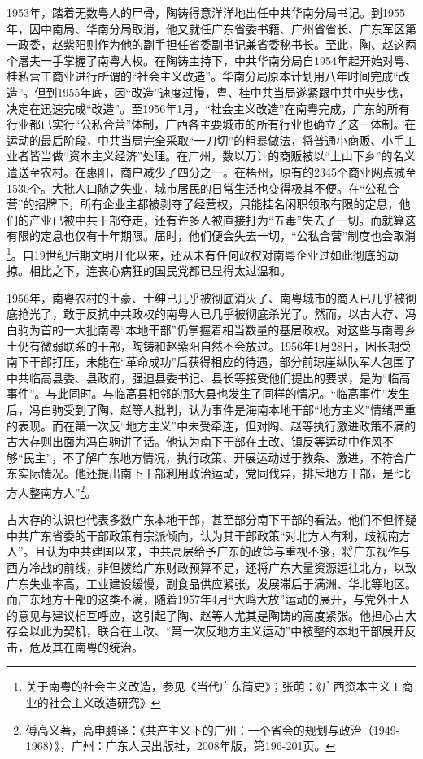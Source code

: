 1953年，踏着无数粤人的尸骨，陶铸得意洋洋地出任中共华南分局书记。到1955年，因中南局、华南分局取消，他又就任广东省委书籍、广州省省长、广东军区第一政委，赵紫阳则作为他的副手担任省委副书记兼省委秘书长。至此，陶、赵这两个屠夫一手掌握了南粤大权。在陶铸主持下，中共华南分局自1954年起开始对粤、桂私营工商业进行所谓的“社会主义改造”。华南分局原本计划用八年时间完成“改造”。但到1955年底，因“改造”速度过慢，粤、桂中共当局遂紧跟中共中央步伐，决定在迅速完成“改造”。至1956年1月，“社会主义改造”在南粤完成，广东的所有行业都已实行“公私合营”体制，广西各主要城市的所有行业也确立了这一体制。在运动的最后阶段，中共当局完全采取“一刀切”的粗暴做法，将普通小商贩、小手工业者皆当做“资本主义经济”处理。在广州，数以万计的商贩被以“上山下乡”的名义遣送至农村。在惠阳，商户减少了四分之一。在梧州，原有的2345个商业网点减至1530个。大批人口随之失业，城市居民的日常生活也变得极其不便。在“公私合营”的招牌下，所有企业主都被剥夺了经营权，只能挂名闲职领取有限的定息，他们的产业已被中共干部夺走，还有许多人被直接打为“五毒”失去了一切。而就算这有限的定息也仅有十年期限。届时，他们便会失去一切，“公私合营”制度也会取消\footnote{关于南粤的社会主义改造，参见《当代广东简史》；张萌：《广西资本主义工商业的社会主义改造研究》}。自19世纪后期文明开化以来，还从未有任何政权对南粤企业过如此彻底的劫掠。相比之下，连丧心病狂的国民党都已显得太过温和。

1956年，南粤农村的土豪、士绅已几乎被彻底消灭了、南粤城市的商人已几乎被彻底抢光了，敢于反抗中共政权的南粤人已几乎被彻底杀光了。然而，以古大存、冯白驹为首的一大批南粤“本地干部”仍掌握着相当数量的基层政权。对这些与南粤乡土仍有微弱联系的干部，陶铸和赵紫阳自然不会放过。1956年1月28日，因长期受南下干部打压，未能在“革命成功”后获得相应的待遇，部分前琼崖纵队军人包围了中共临高县委、县政府，强迫县委书记、县长等接受他们提出的要求，是为“临高事件”。与此同时。与临高县相邻的那大县也发生了同样的情况。“临高事件”发生后，冯白驹受到了陶、赵等人批判，认为事件是海南本地干部“地方主义”情绪严重的表现。而在第一次反“地方主义”中未受牵连，但对陶、赵等执行激进政策不满的古大存则出面为冯白驹讲了话。他认为南下干部在土改、镇反等运动中作风不够“民主”，不了解广东地方情况，执行政策、开展运动过于教条、激进，不符合广东实际情况。他还提出南下干部利用政治运动，党同伐异，排斥地方干部，是“北方人整南方人”\footnote{傅高义著，高申鹏译：《共产主义下的广州：一个省会的规划与政治（1949-1968）》，广州：广东人民出版社，2008年版，第196-201页。}。

古大存的认识也代表多数广东本地干部，甚至部分南下干部的看法。他们不但怀疑中共广东省委的干部政策有宗派倾向，认为其干部政策“对北方人有利，歧视南方人”。且认为中共建国以来，中共高层给予广东的政策与重视不够，将广东视作与西方冷战的前线，非但拨给广东财政预算不足，还将广东大量资源运往北方，以致广东失业率高，工业建设缓慢，副食品供应紧张，发展滞后于满洲、华北等地区。而广东地方干部的这类不满，随着1957年4月“大鸣大放”运动的展开，与党外士人的意见与建议相互呼应，这引起了陶、赵等人尤其是陶铸的高度紧张。他担心古大存会以此为契机，联合在土改、“第一次反地方主义运动”中被整的本地干部展开反击，危及其在南粤的统治。


